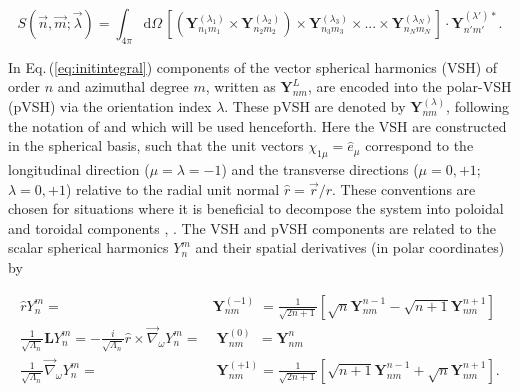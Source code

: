 \documentclass[times]{aastex631}
\newcommand{\nabang}{\vec{\nabla}_{\omega}}
\newcommand{\nin}{\noindent}
\newcommand{\dOmega}{\mathrm{d}\Omega}
\newcommand{\ypvsh}[2]{\mathbf{Y}_{#1}^{(#2)}}
\newcommand{\yvsh}[2]{\mathbf{Y}_{#1}^{#2}}
\begin{document}

\begin{equation}\label{eq:initintegral}
  S(\vec{n},\vec{m};\vec{\lambda}) = \int_{4\pi}\dOmega\,\left[\left(\yvsh{n_1 m_1}{\left(\lambda_1\right)}\times\yvsh{n_2 m_2}{\left(\lambda_2\right)}\right)\times\yvsh{n_3 m_3}{\left(\lambda_3\right)}\times...\times\yvsh{n_{N}m_{N}}{\left(\lambda_{N}\right)}\right]\cdot \yvsh{n' m'}{\left(\lambda'\right)*}.
\end{equation}

\nin  In Eq.\,(\ref{eq:initintegral}) components of the vector spherical harmonics (VSH) of order $n$ and azimuthal degree $m$, written as $\yvsh{n m}{L}$, are encoded into the polar-VSH (pVSH) via the orientation index $\lambda$. These pVSH are denoted by $\ypvsh{n m}{\lambda}$, following the notation of \cite{AkheizerBook} and \cite{QTAM} which will be used henceforth. Here the VSH are constructed in the spherical basis, such that the unit vectors $\chi_{1\mu}=\hat{e}_{\mu}$ correspond to the longitudinal direction ($\mu=\lambda=-1$) and the transverse directions ($\mu=0,+1$; $\lambda=0,+1$) relative to the radial unit normal $\hat{r}=\vec{r}/r$. These conventions are chosen for situations where it is beneficial to decompose the system into poloidal and toroidal components \citep{KrauseRadlerBook}, . The VSH and pVSH components are related to the scalar spherical harmonics $Y_n^m$ and their spatial derivatives (in polar coordinates) by

\begin{align}
\hat{r}Y_n^m = & \ypvsh{n m}{-1} \; = \frac{1}{\sqrt{2n+1}}\left[\sqrt{n}\yvsh{n m}{n-1} - \sqrt{n+1}\yvsh{n m}{n+1}\right]\label{eq:lam-1}\\
\frac{1}{\sqrt{\Lambda_n}}\widehat{\textbf{L}}Y_n^m = -\frac{i}{\sqrt{\Lambda_n}}\hat{r}\times\nabang Y_n^m = & \;\ypvsh{n m}{0}\;\, = \yvsh{n m}{n}\label{eq:lam0}\\
\frac{1}{\sqrt{\Lambda_n}}\nabang Y_n^m = & \;\ypvsh{n m}{+1} = \frac{1}{\sqrt{2n+1}}\left[\sqrt{n+1}\yvsh{n m}{n-1} + \sqrt{n}\yvsh{n m}{n+1}\right].\label{eq:lam+1}
\end{align}
\end{document}
